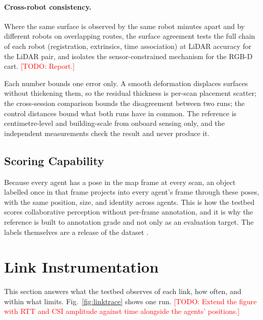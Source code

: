 \documentclass[journal]{IEEEtran}
\newcommand{\todo}[1]{\textcolor{red}{[TODO: #1]}}
\begin{document}
\paragraph{Cross-robot consistency.} Where the same surface is observed
by the same robot minutes apart and by different robots on overlapping
routes, the surface agreement tests the full chain of each robot
(registration, extrinsics, time association) at LiDAR accuracy for the
LiDAR pair, and isolates the sensor-constrained mechanism for the
RGB-D cart. \todo{Report.}



Each number bounds one error only. A smooth deformation displaces
surfaces without thickening them, so the residual thickness is
per-scan placement scatter; the cross-session comparison bounds the
disagreement between two runs; the control distances bound what both
runs have in common. The reference is centimetre-level and
building-scale from onboard sensing only, and the independent
measurements check the result and never produce it.

\subsection{Scoring Capability}
Because every agent has a pose in the map frame at every scan, an
object labelled once in that frame projects into every agent's frame
through these poses, with the same position, size, and identity across
agents. This is how the testbed scores collaborative perception
without per-frame annotation, and it is why the reference is built to
annotation grade and not only as an evaluation target. The labels
themselves are a release of the dataset \cite{scoop_dataset}.

\section{Link Instrumentation}
\label{sec:link}
This section answers what the testbed observes of each link, how
often, and within what limits. Fig.~\ref{fig:linktrace} shows one run.
\todo{Extend the figure with RTT and CSI amplitude against time
alongside the agents' positions.}
\end{document}
